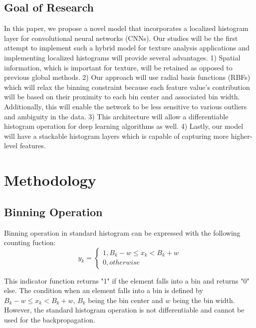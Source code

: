 \documentclass[10pt,twocolumn,letterpaper]{article}
\begin{document}
\subsection{Goal of Research}

In this paper, we propose a novel model that incorporates a localized histogram layer for convolutional neural  networks (CNNs). Our studies will be the first attempt to implement such a hybrid model for texture analysis applications and implementing localized histograms will provide several advantages.
1) Spatial information, which is important for texture, will be retained as opposed to previous global methods. 2) Our approach will use radial basis functions (RBFs) which will relax the binning constraint because each feature value's contribution will be based on their proximity to each bin center and associated bin width. Additionally, this will enable the network to be less sensitive to various outliers and ambiguity in the data. 3) This architecture will allow a differentiable histogram operation for deep learning algorithms as well. 4) Lastly, our model will have a stackable histogram layers which is capable of capturing more higher-level features.
\\


\section{Methodology}

\subsection{Binning Operation}

Binning operation in standard histogram can be expressed with the following counting fuction:
\begin{equation}
\label{eqn:cf}
y_k = \begin{cases}
1,B_k - w \leq x_k < B_k + w\\
0, otherwise
\end{cases}
\end{equation}

This indicator function returns "1" if the  element falls into a bin and returns "0" else. The condition when an element falls into a bin is defined by $B_k - w \leq x_k < B_k + w$, $B_k$ being the bin center and $w$ being the bin width. However, the standard histogram operation is not differentiable and cannot be used for the backpropagation.\\
\end{document}
